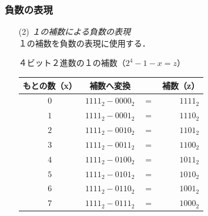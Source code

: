 \documentclass[handout]{beamer}        %
\begin{document}
\begin{frame}
  \frametitle{負数の表現}
\begin{enumerate}
\item[(2)] \emph{１の補数による負数の表現}\\
  １の補数を負数の表現に使用する．
  \begin{itembox}[l]{４ビット２進数の１の補数（$2^4 - 1 - x = z$）}
    \begin{tabular}{ c | r c r}
      \hline
      \hline
      もとの数（x） & \multicolumn{1}{|c}{補数へ変換}
      & & \multicolumn{1}{c}{補数（z）} \\
      \hline
      $0$  & $1111_2 - 0000_2$ & $=$ & $1111_2$ \\
      $1$  & $1111_2 - 0001_2$ & $=$ & $1110_2$ \\
      $2$  & $1111_2 - 0010_2$ & $=$ & $1101_2$ \\
      $3$  & $1111_2 - 0011_2$ & $=$ & $1100_2$ \\
      $4$  & $1111_2 - 0100_2$ & $=$ & $1011_2$ \\
      $5$  & $1111_2 - 0101_2$ & $=$ & $1010_2$ \\
      $6$  & $1111_2 - 0110_2$ & $=$ & $1001_2$ \\
      $7$  & $1111_2 - 0111_2$ & $=$ & $1000_2$ \\
    \end{tabular}
  \end{itembox}
\end{enumerate}
\end{frame}
\end{document}
